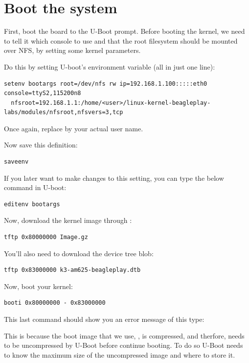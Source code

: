 \section{Boot the system}

First, boot the board to the U-Boot prompt. Before booting the kernel,
we need to tell it which console to use and that the root filesystem
should be mounted over NFS, by setting some kernel parameters.

Do this by setting U-boot's  environment variable (all in
just one line):

\begin{verbatim}
setenv bootargs root=/dev/nfs rw ip=192.168.1.100:::::eth0 console=ttyS2,115200n8
  nfsroot=192.168.1.1:/home/<user>/linux-kernel-beagleplay-labs/modules/nfsroot,nfsvers=3,tcp
\end{verbatim}

Once again, replace  by your actual user name.

Now save this definition:
\begin{verbatim}
saveenv
\end{verbatim}

If you later want to make changes to this setting, you can type the
below command in U-boot:

\begin{verbatim}
editenv bootargs
\end{verbatim}

Now, download the kernel image through :

\begin{verbatim}
tftp 0x80000000 Image.gz
\end{verbatim}

You'll also need to download the device tree blob:

\begin{verbatim}
tftp 0x83000000 k3-am625-beagleplay.dtb
\end{verbatim}

Now, boot your kernel:

\begin{verbatim}
booti 0x80000000 - 0x83000000
\end{verbatim}

This last command should show you an error message of this type:

This is because the boot image that we use, , is compressed, and
therfore, needs to be uncompressed by U-Boot before continue booting. To do so
U-Boot needs to know the maximum size of the uncompressed image and where to
store it.

